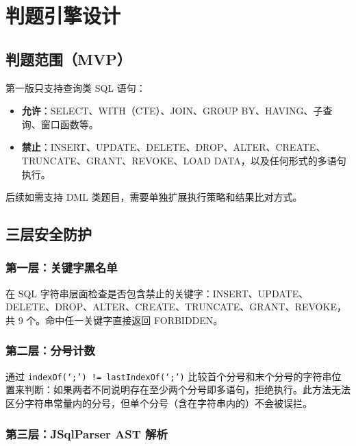 \documentclass[12pt,a4paper]{ctexart}
\begin{document}
\section{判题引擎设计}

\subsection{判题范围（MVP）}

第一版只支持查询类 SQL 语句：

\begin{itemize}
  \item \textbf{允许}：SELECT、WITH（CTE）、JOIN、GROUP BY、HAVING、子查询、窗口函数等。
  \item \textbf{禁止}：INSERT、UPDATE、DELETE、DROP、ALTER、CREATE、TRUNCATE、GRANT、REVOKE、LOAD DATA，以及任何形式的多语句执行。
\end{itemize}

后续如需支持 DML 类题目，需要单独扩展执行策略和结果比对方式。

\subsection{三层安全防护}

\subsubsection*{第一层：关键字黑名单}

在 SQL 字符串层面检查是否包含禁止的关键字：INSERT、UPDATE、DELETE、DROP、ALTER、CREATE、TRUNCATE、GRANT、REVOKE，共 9 个。命中任一关键字直接返回 FORBIDDEN。

\subsubsection*{第二层：分号计数}

通过 \texttt{indexOf(`;') != lastIndexOf(`;')} 比较首个分号和末个分号的字符串位置来判断：如果两者不同说明存在至少两个分号即多语句，拒绝执行。此方法无法区分字符串常量内的分号，但单个分号（含在字符串内的）不会被误拦。

\subsubsection*{第三层：JSqlParser AST 解析}
\end{document}
